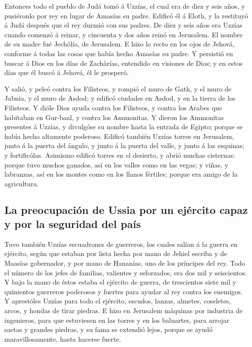  Entonces todo el pueblo de Judá tomó á Uzzías, el cual
era de diez y seis años, y pusiéronlo por rey en lugar de Amasías su
padre.  Edificó él á Eloth, y la restituyó á Judá después
que el rey durmió con sus padres.  De diez y seis años era
Uzzías cuando comenzó á reinar, y cincuenta y dos años reinó en
Jerusalem. El nombre de su madre fué Jechôlía, de Jerusalem.
 E hizo lo recto en los ojos de Jehová, conforme á todas
las cosas que había hecho Amasías su padre.  Y persistió
en buscar á Dios en los días de Zachârías, entendido en visiones de
Dios; y en estos días que él buscó á Jehová, él le prosperó.

 Y salió, y peleó contra los Filisteos, y rompió el muro
de Gath, y el muro de Jabnia, y el muro de Asdod; y edificó ciudades en
Asdod, y en la tierra de los Filisteos.  Y dióle Dios
ayuda contra los Filisteos, y contra los Arabes que habitaban en
Gur-baal, y contra los Ammonitas.  Y dieron los Ammonitas
presentes á Uzzías, y divulgóse su nombre hasta la entrada de Egipto;
porque se había hecho altamente poderoso.  Edificó también
Uzzías torres en Jerusalem, junto á la puerta del ángulo, y junto á la
puerta del valle, y junto á las esquinas; y fortificólas.
 Asimismo edificó torres en el desierto, y abrió muchas
cisternas: porque tuvo muchos ganados, así en los valles como en las
vegas; y viñas, y labranzas, así en los montes como en los llanos
fértiles; porque era amigo de la agricultura.

\hypertarget{la-preocupaciuxf3n-de-ussia-por-un-ejuxe9rcito-capaz-y-por-la-seguridad-del-pauxeds}{%
\subsection{La preocupación de Ussia por un ejército capaz y por la
seguridad del
país}\label{la-preocupaciuxf3n-de-ussia-por-un-ejuxe9rcito-capaz-y-por-la-seguridad-del-pauxeds}}

 Tuvo también Uzzías escuadrones de guerreros, los cuales
salían á la guerra en ejército, según que estaban por lista hecha por
mano de Jehiel escriba y de Maasías gobernador, y por mano de Hananías,
uno de los príncipes del rey.  Todo el número de los
jefes de familias, valientes y esforzados, era dos mil y seiscientos.
 Y bajo la mano de éstos estaba el ejército de guerra, de
trescientos siete mil y quinientos guerreros poderosos y fuertes para
ayudar al rey contra los enemigos.  Y aprestóles Uzzías
para todo el ejército, escudos, lanzas, almetes, coseletes, arcos, y
hondas de tirar piedras.  E hizo en Jerusalem máquinas
por industria de ingenieros, para que estuviesen en las torres y en los
baluartes, para arrojar saetas y grandes piedras, y su fama se extendió
lejos, porque se ayudó maravillosamente, hasta hacerse fuerte.


